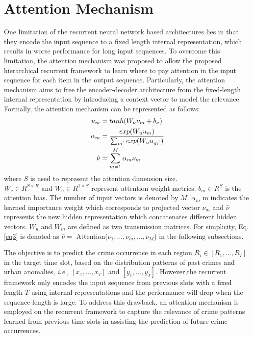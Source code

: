 \section{Attention Mechanism}

One limitation of the recurrent neural network based architectures
lies in that they encode the input sequence to a fixed length internal
representation, which results in worse performance for long input
sequences. To overcome this limitation, the attention mechanism was proposed to allow the proposed hierarchical recurrent
framework to learn where to pay attention in the input sequence
for each item in the output sequence. Particularly, the attention
mechanism aims to free the encoder-decoder architecture from the
fixed-length internal representation by introducing a context vector
to model the relevance. Formally, the attention mechanism can be
represented as follows:
\begin{align}
            u_m &= tanh(W_\nu\nu_m + b_\nu)\notag\\
            \alpha_m &= \frac{exp(W_uu_m)}{\sum_{m^{'}}exp(W_uu_{m^{'}})}\notag\\
            \hat{\nu} &= \sum_{m=1}^M\alpha_m\nu_m \label{eq3}
\end{align}
where $S$ is used to represent the attention dimension size. \(W_\nu \in R^{S\times R} \text{ and } W_u \in R^{1\times S}\) represent attention weight metrics. $b_m \in R^S$ is the attention bias. The number of input vectors is denoted by $M$. $\alpha_m$ m indicates the learned importance weight which corresponds to projected vector $\nu_m$ and $\hat{\nu}$ represents the new hidden representation which concatenates different hidden vectors. $W_u$ and $W_m$ are defined as two transmission matrices. For simplicity, Eq. \ref{eq3} is denoted as $\hat{\nu} = $ Attention($\nu_1,...,\nu_m,...,\nu_M$) in the following subsections. 

The objective is to predict the crime occurrence in each region \(R_i \in [R_1,...,R_I]\) in the target time slot, based on the distribution
patterns of past crimes and urban anomalies, \emph{i.e.,} $[x_1,...,x_T]$ and $[y_1,...,y_T]$. However,the recurrent framework only encodes the input sequence from previous slots with a fixed length $T$ using internal representations and the performance will drop when the sequence length is large. To address this drawback, an attention mechanism is employed on the recurrent framework to
capture the relevance of crime patterns learned from previous time
slots in assisting the prediction of future crime occurrences.

